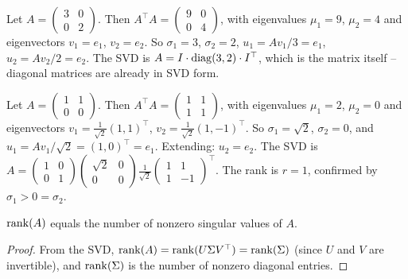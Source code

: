 \documentclass[11pt,a4paper]{article}
\begin{document}
\begin{example}
\label{ex:svd_2x2}
Let $A = \begin{pmatrix} 3 & 0 \\ 0 & 2 \end{pmatrix}$.
Then $A^\top A = \begin{pmatrix} 9 & 0 \\ 0 & 4 \end{pmatrix}$, with
eigenvalues $\mu_1 = 9$, $\mu_2 = 4$ and eigenvectors $v_1 = e_1$,
$v_2 = e_2$.  So $\sigma_1 = 3$, $\sigma_2 = 2$, $u_1 = Av_1/3 = e_1$,
$u_2 = Av_2/2 = e_2$.  The SVD is $A = I \cdot \operatorname{diag}(3,2) \cdot I^\top$,
which is the matrix itself -- diagonal matrices are already in SVD form.
\end{example}

\begin{example}
\label{ex:svd_nonsquare}
Let $A = \begin{pmatrix} 1 & 1 \\ 0 & 0 \end{pmatrix}$.
Then $A^\top A = \begin{pmatrix} 1 & 1 \\ 1 & 1 \end{pmatrix}$,
with eigenvalues $\mu_1 = 2$, $\mu_2 = 0$ and eigenvectors
$v_1 = \frac{1}{\sqrt{2}}(1,1)^\top$,
$v_2 = \frac{1}{\sqrt{2}}(1,-1)^\top$.
So $\sigma_1 = \sqrt{2}$, $\sigma_2 = 0$, and
$u_1 = Av_1/\sqrt{2} = (1, 0)^\top = e_1$.
Extending: $u_2 = e_2$.  The SVD is
$A = \begin{pmatrix} 1 & 0 \\ 0 & 1 \end{pmatrix}
\begin{pmatrix} \sqrt{2} & 0 \\ 0 & 0 \end{pmatrix}
\frac{1}{\sqrt{2}}\begin{pmatrix} 1 & 1 \\ 1 & -1 \end{pmatrix}^\top$.
The rank is $r = 1$, confirmed by $\sigma_1 > 0 = \sigma_2$.
\end{example}

\begin{proposition}
\label{prop:rank_svd}
$\operatorname{rank}(A)$ equals the number of nonzero singular values of $A$.
\end{proposition}

\begin{proof}
From the SVD, $\operatorname{rank}(A) = \operatorname{rank}(U\Sigma V^\top) = \operatorname{rank}(\Sigma)$
(since $U$ and $V$ are invertible), and $\operatorname{rank}(\Sigma)$ is the number
of nonzero diagonal entries.
\end{proof}
\end{document}
